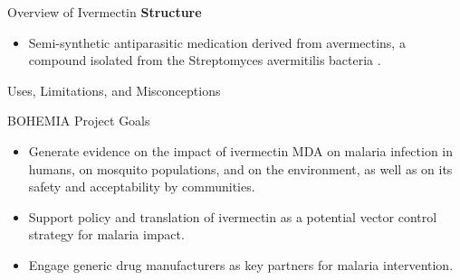 \documentclass[
  ignorenonframetext,
]{beamer}
\providecommand{\tightlist}{%
  \setlength{\itemsep}{0pt}\setlength{\parskip}{0pt}}
\begin{document}
\begin{frame}{Overview of Ivermectin}
\label{overview-of-ivermectin}
\textbf{Structure}

\begin{itemize}
\tightlist
\item
  Semi-synthetic antiparasitic medication derived from avermectins, a
  compound isolated from the Streptomyces avermitilis bacteria .
\end{itemize}
\end{frame}

\begin{frame}{Uses, Limitations, and Misconceptions}
\label{uses-limitations-and-misconceptions}
\end{frame}

\begin{frame}{BOHEMIA Project Goals}
\label{bohemia-project-goals}
\begin{itemize}
\item
  Generate evidence on the impact of ivermectin MDA on malaria infection
  in humans, on mosquito populations, and on the environment, as well as
  on its safety and acceptability by communities.
\item
  Support policy and translation of ivermectin as a potential vector
  control strategy for malaria impact.
\item
  Engage generic drug manufacturers as key partners for malaria
  intervention.
\end{itemize}
\end{frame}
\end{document}
